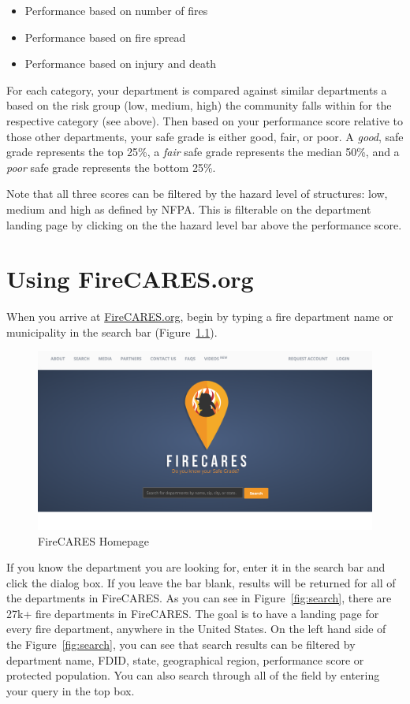 \documentclass[12pt,oneside]{book}
\begin{document}
\begin{itemize}
\item Performance based on number of fires
\item Performance based on fire spread
\item Performance based on injury and death
\end{itemize}

For each category, your department is compared against similar departments a based on the risk group (low, medium, high) the community falls within for the respective category (see above). Then based on your performance score relative to those other departments, your safe grade is either good, fair, or poor. A {\it good}, safe grade represents the top 25\%, a {\it fair} safe grade represents the median 50\%, and a {\it poor} safe grade represents the bottom 25\%.

Note that all three scores can be filtered by the hazard level of structures: low, medium and high as defined by NFPA. This is filterable on the department landing page by clicking on the the hazard level bar above the performance score. 

\chapter{Using FireCARES.org}

When you arrive at \href{https://firecares.org}{FireCARES.org}, begin by typing a fire department name or municipality in the search bar (Figure~\ref{fig:homepage}). 

\begin{figure}[ht!]
\centering
\includegraphics[width=.9\columnwidth]{Figures/homepage}
\caption{FireCARES Homepage}
\label{fig:homepage}
\end{figure}

If you know the department you are looking for, enter it in the search bar and click the dialog box. If you leave the bar blank, results will be returned for all of the departments in FireCARES. As you can see in Figure~\ref{fig:search}, there are 27k+ fire departments in FireCARES. The goal is to have a landing page for every fire department, anywhere in the United States. On the left hand side of the Figure~\ref{fig:search}, you can see that search results can be filtered by department name, FDID, state, geographical region, performance score or protected population. You can also search through all of the field by entering your query in the top box.
\end{document}
